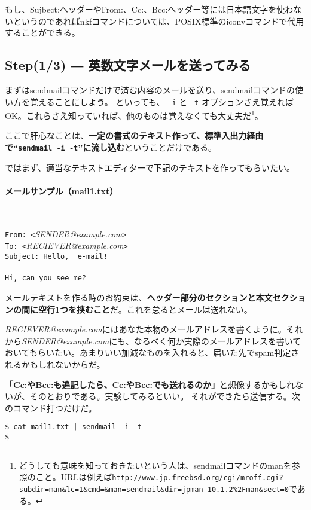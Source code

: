 もし、Sujbect:ヘッダーやFrom:、Cc:、Bcc:ヘッダー等には日本語文字を使わないというのであればnkfコマンドについては、POSIX標準のiconvコマンドで代用することができる。

\subsection*{Step(1/3) ― 英数文字メールを送ってみる}

まずはsendmailコマンドだけで済む内容のメールを送り、sendmailコマンドの使い方を覚えることにしよう。
といっても、 \verb|-i| と \verb|-t| オプションさえ覚えればOK。これらさえ知っていれば、他のものは覚えなくても大丈夫だ\footnote{どうしても意味を知っておきたいという人は、sendmailコマンドのmanを参照のこと。URLは例えば\verb|http://www.jp.freebsd.org/cgi/mroff.cgi?subdir=man&lc=1&cmd=&man=sendmail&dir=jpman-10.1.2%2Fman&sect=0|である。}。

ここで肝心なことは、\textbf{一定の書式のテキスト作って、標準入出力経由で``\verb|sendmail -i -t|''に流し込む}ということだけである。

ではまず、適当なテキストエディターで下記のテキストを作ってもらいたい。
\paragraph{メールサンプル（mail1.txt）}　\\
\begin{frameboxit}{160.0mm}
	\verb|From: <|\textit{SENDER@example.com}\verb|>| \\
	\verb|To: <|\textit{RECIEVER@example.com}\verb|>| \\
	\verb|Subject: Hello,  e-mail!| \\
	\verb|| \\
	\verb|Hi, can you see me?|
\end{frameboxit}

メールテキストを作る時のお約束は、\textbf{ヘッダー部分のセクションと本文セクションの間に空行1つを挟むこと}だ。これを怠るとメールは送れない。

\textit{RECIEVER@example.com}にはあなた本物のメールアドレスを書くように。それから\textit{SENDER@example.com}にも、なるべく何か実際のメールアドレスを書いておいてもらいたい。あまりいい加減なものを入れると、届いた先でspam判定されるかもしれないからだ。

\textbf{「Cc:やBcc:も追記したら、Cc:やBcc:でも送れるのか」}と想像するかもしれないが、そのとおりである。実験してみるといい。
それができたら送信する。次のコマンド打つだけだ。
\begin{screen}
	\verb!$ cat mail1.txt | sendmail -i -t! \return \\
	\verb!$ !
\end{screen}

